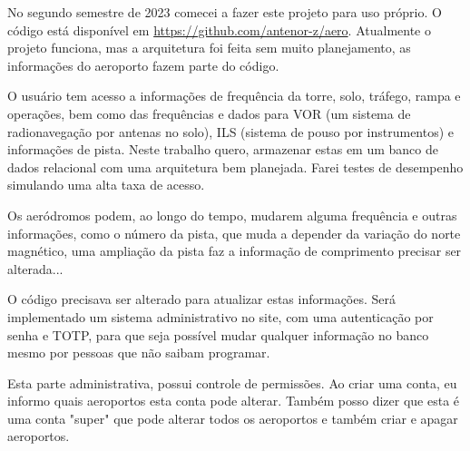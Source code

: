No segundo semestre de 2023 comecei a fazer este projeto para uso próprio.
O código está disponível em \url{https://github.com/antenor-z/aero}. Atualmente o
projeto funciona, mas a arquitetura foi feita sem muito planejamento, as
informações do aeroporto fazem parte do código.

O usuário tem acesso a informações de frequência da torre, solo, tráfego, rampa
e operações, bem como das frequências e dados para VOR (um sistema de radionavegação
por antenas no solo), ILS (sistema de pouso por instrumentos) e informações de 
pista. Neste trabalho quero, armazenar estas em um banco de dados relacional com 
uma arquitetura bem planejada. Farei testes de desempenho simulando uma alta taxa 
de acesso.

Os aeródromos podem, ao longo do tempo, mudarem alguma frequência e outras
informações, como o número da pista, que muda a depender da variação do norte 
magnético, uma ampliação da pista faz a informação de comprimento precisar ser 
alterada...

O código precisava ser alterado para atualizar estas informações. Será implementado
 um sistema administrativo no site, com uma autenticação por senha e TOTP, para 
 que seja possível mudar qualquer informação no banco mesmo por pessoas que não 
 saibam programar.

Esta parte administrativa, possui controle de permissões. Ao criar uma conta, eu
 informo quais aeroportos esta conta pode alterar. Também posso dizer que esta é
  uma conta "super" que pode alterar todos os aeroportos e também criar e apagar 
 aeroportos.
